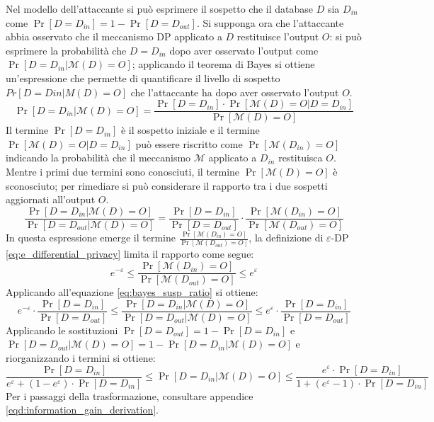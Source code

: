 Nel modello dell'attaccante si può esprimere il sospetto che il database $D$ sia $D_{in}$ come $\Pr[D = D_{in}] = 1 - \Pr[D = D_{out}]$. Si supponga ora che l'attaccante abbia osservato che il meccanismo DP applicato a $D$ restituisce l'output $O$: si può esprimere la probabilità che $D = D_{in}$ dopo aver osservato l'output come $\Pr[D = D_{in} | \mathcal{M}(D) = O]$; applicando il teorema di Bayes si ottiene un'espressione che permette di quantificare il livello di sospetto $Pr[D = Din|M(D) = O]$ che l'attaccante ha dopo aver osservato l'output $O$.
\begin{equation}
\label{eq:bayes_susp}
    \Pr[D = D_{in} | \mathcal{M}(D) = O] = \frac{\Pr[D = D_{in}] \cdot \Pr[\mathcal{M}(D) = O | D = D_{in}]}{\Pr[\mathcal{M}(D) = O]}
\end{equation}
Il termine $\Pr[D = D_{in}]$ è il sospetto iniziale e il termine $\Pr[\mathcal{M}(D) = O | D = D_{in}]$ può essere riscritto come $\Pr[\mathcal{M}(D_{in}) = O]$ indicando la probabilità che il meccanismo $\mathcal{M}$ applicato a $D_{in}$ restituisca $O$. Mentre i primi due termini sono conosciuti, il termine $\Pr[\mathcal{M}(D) = O]$ è sconosciuto; per rimediare si può considerare il rapporto tra i due sospetti aggiornati all'output $O$.
\begin{equation}
\label{eq:bayes_susp_ratio}
    \frac{\Pr[D = D_{in} | \mathcal{M}(D) = O]}{\Pr[D = D_{out} | \mathcal{M}(D) = O]} = \frac{\Pr[D = D_{in}]}{\Pr[D = D_{out}]} \cdot \frac{\Pr[\mathcal{M}(D_{in}) = O]}{\Pr[\mathcal{M}(D_{out}) = O]}
\end{equation}
In questa espressione emerge il termine $\frac{\Pr[\mathcal{M}(D_{in}) = O]}{\Pr[\mathcal{M}(D_{out}) = O]}$, la definizione di $\varepsilon$-DP \eqref{eq:e_differential_privacy} limita il rapporto come segue:
\begin{equation}
\label{eq:e_dp_bounds}
    e^{-\varepsilon} \le \frac{\Pr[\mathcal{M}(D_{in}) = O]}{\Pr[\mathcal{M}(D_{out}) = O]} \le e^{\varepsilon}
\end{equation}
Applicando all'equazione \eqref{eq:bayes_susp_ratio} si ottiene:
\begin{equation}
\label{eq:mid_information_gain}
    e^{-\varepsilon} \cdot \frac{\Pr[D = D_{in}]}{\Pr[D = D_{out}]} \le \frac{\Pr[D = D_{in} | \mathcal{M}(D) = O]}{\Pr[D = D_{out} | \mathcal{M}(D) = O]} \le e^{\varepsilon} \cdot \frac{\Pr[D = D_{in}]}{\Pr[D = D_{out}]} 
\end{equation}
Applicando le sostituzioni $\Pr[D = D_{out}] = 1 - \Pr[D = D_{in}]$ e $\Pr[D = D_{out} | \mathcal{M}(D) = O] = 1 - \Pr[D = D_{in} | \mathcal{M}(D) = O]$ e riorganizzando i termini si ottiene:
\begin{equation}
\label{eq:information_gain}
    \frac{\Pr[D = D_{in}]}{e^\varepsilon + (1 - e^\varepsilon) \cdot \Pr[D = D_{in}]} \le \Pr[D = D_{in} | \mathcal{M}(D) = O] \le \frac{e^\varepsilon \cdot \Pr[D = D_{in}]}{1 + (e^\varepsilon - 1) \cdot \Pr[D = D_{in}]}
\end{equation}
Per i passaggi della trasformazione, consultare appendice \ref{eqd:information_gain_derivation}.

